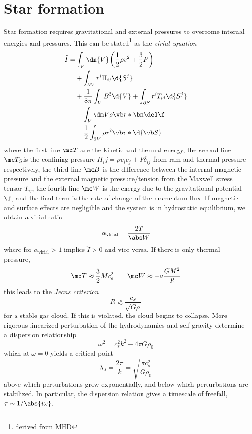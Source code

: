 \documentclass[12pt]{article}
\begin{document}
\section{Star formation}
Star formation requires gravitational and external pressures to overcome internal energies and pressures. This can be stated\cite{krumholz_notes_2016}\footnote{derived from MHD} as the \emph{virial equation}
\begin{align}
    \ddot I =& \int_V\dm{V}\left( \frac{1}{2}\rho v^2 + \frac{3}{2}P \right)\nonumber \\
             & +\int_{\partial V}r^i \Pi_{ij}\d{S^j}\nonumber\\
             & + \frac{1}{8\pi}\int_V B^2\d{V} + \int_{\partial S}r^i T_{ij}\d{S^j}\\
             & -\int_V\dm V \rho \vb r*\bm \del \f\nonumber\\
             & - \frac{1}{2}\int_{\partial V}\rho r^2 \vb v*\d{\vb S}\nonumber
\end{align}
where the first line \( \mc T \) are the kinetic and thermal energy, the second line \( \mc T_S \)is the confining pressure \( \Pi_ij=\rho v_i v_j + P\delta_{ij} \) from ram and thermal pressure respectively, the third line \( \mc B \) is the difference between the internal magnetic pressure and the external magnetic pressure/tension from the Maxwell stress tensor \( T_{ij} \), the fourth line \( \mc W \) is the energy due to the gravitational potential \( \f \), and the final term is the rate of change of the momentum flux. If magnetic and surface effects are negligible and the system is in hydrostatic equilibrium, we obtain a virial ratio
\begin{equation}
    \alpha_\text{virial} = \frac{2T}{\abs W}
\end{equation}
where for \( \alpha_\text{virial}>1 \) implies \( \ddot I>0 \) and vice-versa. If there is only thermal pressure,
\[ \mc T\approx \frac{3}{2}Mc_s^2 \qquad \mc W\approx -a\frac{GM^2}{R} \]
this leads to the \emph{Jeans criterion}
\begin{equation}
    R\gtrsim \frac{c_S}{\sqrt{G\rho}}
\end{equation}
for a stable gas cloud. If this is violated, the cloud begins to collapse. More rigorous linearized perturbation of the hydrodynamics and self gravity determine a dispersion relationship
\begin{equation}
\omega^2 = c_s^2k^2 - 4\pi G\rho_0
\end{equation}
which at \( \omega=0 \) yields a critical point
\begin{equation}
    \lambda_J =\frac{2\pi}{k}=\sqrt{\frac{\pi c_s^2}{G\rho_0}}
\end{equation}
above which perturbations grow exponentially, and below which perturbations are stabilized. In particular, the dispersion relation gives a timescale of freefall, \( \tau\sim 1/\abs{i\omega} \). 
\end{document}
